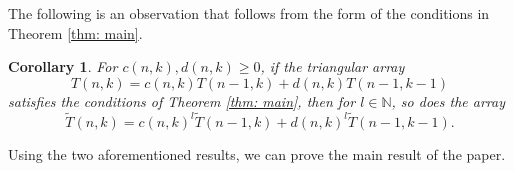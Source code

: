 \documentclass{article}
\newtheorem{theorem}{Theorem}[section]
\newtheorem{corollary}[theorem]{Corollary}
\theoremstyle{definition}
\numberwithin{equation}{section}
\begin{document}
The following is an observation that follows from the form of the conditions in Theorem \ref{thm: main}.
\begin{corollary}\label{cor: multiplicative}
    For $c(n,k),d(n,k)\ge 0$, if the triangular array $$T(n,k)=c(n,k)T(n-1,k)+d(n,k)T(n-1,k-1)$$ satisfies the conditions of Theorem \ref{thm: main}, then for $l\in \mathbb{N}$, so does the array $$\widetilde{T}(n,k)=c(n,k)^l\widetilde{T}(n-1,k)+d(n,k)^l\widetilde{T}(n-1,k-1).$$ 
\end{corollary}
Using the two aforementioned results, we can prove the main result of the paper.
\end{document}
